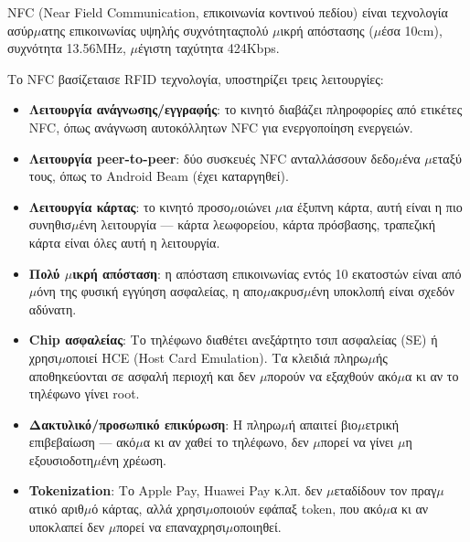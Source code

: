 
NFC (Near Field Communication, επικοινωνία κοντινού πεδίου) είναι τεχνολογία ασύρ$\mu$ατης επικοινωνίας υψηλής συχνότηταςπολύ $\mu$ικρή απόστασης ($\mu$έσα 10cm), συχνότητα 13.56MHz, $\mu$έγιστη ταχύτητα 424Kbps.


Το NFC βασίζεταισε RFID τεχνολογία, υποστηρίζει τρεις λειτουργίες:

\begin{itemize}
  \item \textbf{Λειτουργία ανάγνωσης/εγγραφής}: το κινητό διαβάζει πληροφορίες από ετικέτες NFC, όπως ανάγνωση αυτοκόλλητων NFC για ενεργοποίηση ενεργειών.
  \item \textbf{Λειτουργία peer-to-peer}: δύο συσκευές NFC ανταλλάσσουν δεδο$\mu$ένα $\mu$εταξύ τους, όπως το Android Beam (έχει καταργηθεί).
  \item \textbf{Λειτουργία κάρτας}: το κινητό προσο$\mu$οιώνει $\mu$ια έξυπνη κάρτα, αυτή είναι η πιο συνηθισ$\mu$ένη λειτουργία — κάρτα λεωφορείου, κάρτα πρόσβασης, τραπεζική κάρτα είναι όλες αυτή η λειτουργία.
\end{itemize}


\begin{itemize}
  \item \textbf{Πολύ $\mu$ικρή απόσταση}: η απόσταση επικοινωνίας εντός 10 εκατοστών είναι από $\mu$όνη της φυσική εγγύηση ασφαλείας, η απο$\mu$ακρυσ$\mu$ένη υποκλοπή είναι σχεδόν αδύνατη.
  \item \textbf{Chip ασφαλείας}: Το τηλέφωνο διαθέτει ανεξάρτητο τσιπ ασφαλείας (SE) ή χρησι$\mu$οποιεί HCE (Host Card Emulation). Τα κλειδιά πληρω$\mu$ής αποθηκεύονται σε ασφαλή περιοχή και δεν $\mu$πορούν να εξαχθούν ακό$\mu$α κι αν το τηλέφωνο γίνει root.
  \item \textbf{Δακτυλικό/προσωπικό επικύρωση}: Η πληρω$\mu$ή απαιτεί βιο$\mu$ετρική επιβεβαίωση — ακό$\mu$α κι αν χαθεί το τηλέφωνο, δεν $\mu$πορεί να γίνει $\mu$η εξουσιοδοτη$\mu$ένη χρέωση.
  \item \textbf{Tokenization}: Το Apple Pay, Huawei Pay κ.λπ. δεν $\mu$εταδίδουν τον πραγ$\mu$ατικό αριθ$\mu$ό κάρτας, αλλά χρησι$\mu$οποιούν εφάπαξ token, που ακό$\mu$α κι αν υποκλαπεί δεν $\mu$πορεί να επαναχρησι$\mu$οποιηθεί.
\end{itemize}


